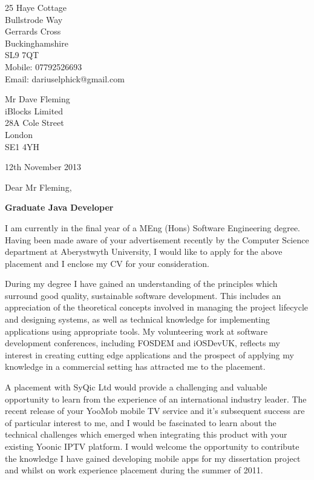 \documentclass[11pt,letterpaper]{article}
\begin{document}
 
\begin{flushright} 
25 Haye Cottage \\ 
Bullstrode Way \\ 
Gerrards Cross \\
Buckinghamshire \\
SL9 7QT \\
Mobile: 07792526693 \\
Email: dariuselphick@gmail.com
\end{flushright}  
\begin{flushleft} 
Mr Dave Fleming \\ 
iBlocks Limited \\ 
28A Cole Street \\ 
London \\
SE1 4YH	
\end{flushleft} 
\begin{flushleft}
12th November 2013
\end{flushleft} 
\bigskip 
Dear Mr Fleming, 

{\bf Graduate Java Developer} 

I am currently in the final year of a MEng (Hons) Software Engineering degree. Having been made aware of your advertisement recently by the Computer Science department at Aberystwyth University, I would like to apply for the above placement and I enclose my CV for your consideration. 
 
During my degree I have gained an understanding of the principles which surround good quality, sustainable software development. This includes an appreciation of the theoretical concepts involved in managing the project lifecycle and designing systems, as well as technical knowledge for implementing applications using appropriate tools. My volunteering work at software development conferences, including FOSDEM and iOSDevUK, reflects my interest in creating cutting edge applications and the prospect of applying my knowledge in a commercial setting has attracted me to the placement.   
 
A placement with SyQic Ltd would provide a challenging and valuable opportunity to learn from the experience of an international industry leader. The recent release of your YooMob mobile TV service and it's subsequent success are of particular interest to me, and I would be fascinated to learn about the technical challenges which emerged when integrating this product with your existing Yoonic IPTV platform. I would welcome the opportunity to contribute the knowledge I have gained developing mobile apps for my dissertation project and whilst on work experience placement during the summer of 2011.  
\end{document}
